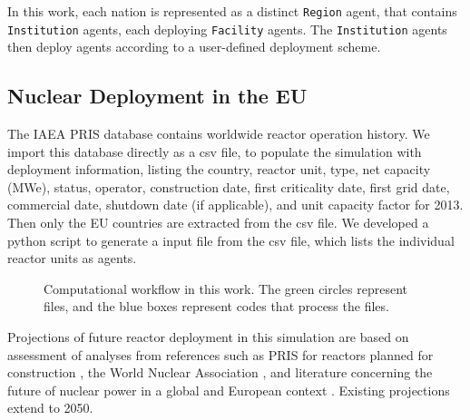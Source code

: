 In this work, each nation is represented as a distinct \texttt{Region} agent,
that contains \texttt{Institution} agents, each deploying  \texttt{Facility} 
agents. The \texttt{Institution} agents then deploy agents according to 
a user-defined deployment scheme.


\subsection{Nuclear Deployment in the \gls{EU}}


The \gls{IAEA} \gls{PRIS} database \cite{iaea_pris_2017} contains worldwide reactor
operation history.
We import this database directly as a csv file, to populate the simulation
with deployment information, listing the country, reactor unit, type, net capacity (\gls{MWe}), status,
operator, construction date, first criticality date, first grid date, commercial date, shutdown
date (if applicable), and unit capacity factor for 2013. Then only the \gls{EU} countries are extracted
from the csv file. We developed a python script to generate a \Cyclus input file from the csv file,
which lists the individual reactor units as agents. 


\begin{figure}
        \centering
\caption{Computational workflow in this work. The green circles represent files, and the blue
         boxes represent codes that process the files.}
\label{diag:comp}
\end{figure}


Projections of future reactor deployment in this simulation are based on
assessment of analyses from references such as \gls{PRIS} for reactors planned
for construction \cite{iaea_pris_2017}, the World Nuclear Association
\cite{world_nuclear_association_nuclear_2017}, and literature concerning the future of
nuclear power in a global \cite{joskow_future_2012} and European context
\cite{hatch_politics_2015}.  Existing projections extend to 2050.

